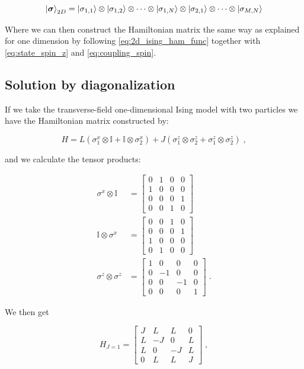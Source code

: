 $$\ket{\boldsymbol{\sigma}}_{2D} = \ket{\sigma_{1, 1}} \otimes \ket{\sigma_{1, 2}} \otimes \dots \otimes \ket{\sigma_{1, N}} \otimes \ket{\sigma_{2, 1}} \otimes \dots \otimes \ket{\sigma_{M, N}}$$

Where we can then construct the Hamiltonian matrix the same way as explained for one dimension by following \ref{eq:2d_ising_ham_func} together with \ref{eq:state_spin_z} and \ref{eq:coupling_spin}.

\subsection{Solution by diagonalization}

If we take the transverse-field one-dimensional Ising model with two particles we have the Hamiltonian matrix constructed by:



$$ H =  L \left ( \sigma^x_1\otimes\mathbb{I} + \mathbb{I}\otimes\sigma_2^x \right ) + J \left (\sigma^z_1\otimes\sigma_2^z + \sigma_1^z\otimes\sigma_2^z \right ) \; ,$$

and we calculate the tensor products:

\begin{align*}
  \sigma^x\otimes\mathbb{I} &= \begin{bmatrix}
    0 & 1 & 0 & 0 \\
    1 & 0 & 0 & 0 \\
    0 & 0 & 0 & 1 \\
    0 & 0 & 1 & 0 \end{bmatrix} \\
    \mathbb{I}\otimes\sigma^x &= \begin{bmatrix}
    0 & 0 & 1 & 0 \\
    0 & 0 & 0 & 1 \\
    1 & 0 & 0 & 0 \\
    0 & 1 & 0 & 0\end{bmatrix} \\
      \sigma^z\otimes\sigma^z &= \begin{bmatrix}
    1 & 0 & 0 & 0 \\
    0 & -1 & 0 & 0 \\
    0 & 0 & -1 & 0 \\
    0 & 0 & 0 & 1\end{bmatrix}\; .
\end{align*}

We then get

\begin{equation}
  H_{J=1} =  \begin{bmatrix}
    J & L & L & 0 \\
    L & -J & 0 & L \\
    L & 0 & -J & L \\
  0 & L & L & J\end{bmatrix} \; ,
\end{equation}

